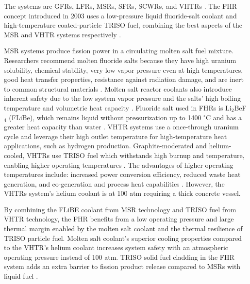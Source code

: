 The systems are \glspl{GFR}, \glspl{LFR}, \glspl{MSR}, \glspl{SFR}, \glspl{SCWR}, 
and \glspl{VHTR} \cite{gif_technology_2002}. 
The \acrfull{FHR} concept introduced in 2003 uses a low-pressure liquid fluoride-salt 
coolant and high-temperature coated-particle \gls{TRISO} fuel, combining 
the best aspects of the \gls{MSR} and \gls{VHTR} systems respectively
\cite{forsberg_molten-salt-cooled_2003,facilitators_fluoride-salt-cooled_2013}.

\gls{MSR} systems produce fission power in a circulating molten salt fuel 
mixture. 
Researchers recommend molten fluoride salts because they have high uranium 
solubility, chemical stability, very low vapor pressure even at high 
temperatures, good heat transfer properties, resistance against radiation 
damage, and are inert to common structural materials 
\cite{rosenthal_molten-salt_1970}. 
Molten salt reactor coolants also introduce inherent safety due to the 
low system vapor pressure and the salts' high boiling temperature and 
volumetric heat capacity \cite{ho_molten_2013}.
Fluoride salt used in \glspl{FHR} is Li$_2$BeF$_4$ (FLiBe), 
which remains liquid without pressurization up to 1400 $^{\circ}$C and has a greater 
heat capacity than water \cite{ho_molten_2013,forsberg_fluoride-salt-cooled_2012}.
\gls{VHTR} systems use a once-through uranium cycle and leverage their 
high outlet temperature for high-temperature heat applications, such as 
hydrogen production. 
Graphite-moderated and helium-cooled, \glspl{VHTR} use \gls{TRISO} fuel
which withstands high burnup and temperature, enabling higher operating 
temperatures \cite{gif_technology_2002}.  
The advantages of higher operating temperatures include: increased power 
conversion efficiency, reduced waste heat generation, and co-generation and 
process heat capabilities \cite{scarlat_design_2014}.
However, the \glspl{VHTR} system's helium coolant is at 100 atm requiring a 
thick concrete vessel. 

By combining the FLiBE coolant from \gls{MSR} technology and 
\gls{TRISO} fuel from \gls{VHTR} technology, the \gls{FHR} benefits from 
a low operating pressure and large thermal margin enabled by the molten 
salt coolant and the thermal resilience of \gls{TRISO} particle fuel. 
Molten salt coolant's superior cooling properties compared to the \gls{VHTR}'s
helium coolant increases system safety with an atmospheric operating pressure 
instead of 100 atm. 
\gls{TRISO} solid fuel cladding in the \gls{FHR} system adds an extra barrier 
to fission product release compared to \glspl{MSR} with liquid fuel 
\cite{ho_molten_2013}.

